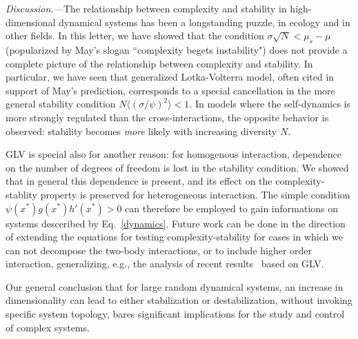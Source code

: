 \emph{Discussion.---}The relationship between complexity and stability in high-dimensional dynamical systems has been a longstanding puzzle, in ecology and in other fields. 
In this letter, we have showed that the condition $\sigma\sqrt{N}< \mu_s - \mu$ (popularized by May's slogan ``complexity begets instability") does not provide a complete picture of the relationship between complexity and stability. 
In particular, we have seen that generalized Lotka-Volterra model, often cited in support of May's prediction, corresponds to a special cancellation in the more general stability condition $N\langle (\sigma/\psi)^2\rangle < 1$.
In models where the self-dynamics is more strongly regulated than the cross-interactions, the opposite behavior is observed: stability becomes \emph{more} likely with increasing diversity $N$.

GLV is special also for another reason: for homogenous interaction, dependence on the number of degrees of freedom is lost in the stability condition.
We showed that in general this dependence is present, and its effect on the complexity-stablity property is preserved for heterogeneous interaction. 
The simple condition $\psi(x^*)g(x^*)h'(x^*)>0$ can therefore be employed to gain informations on systems desceribed by Eq.~\eqref{dynamics}.
Future work can be done in the direction of extending the equations for testing complexity-stability for cases in which we can not decompose the two-body interactions, or to include higher order interaction, generalizing, e.g., the analysis of recent results~\cite{Gibbs2022} based on GLV. 


Our general conclusion that for large random dynamical systems, an increase in dimensionality can lead to either stabilization or destabilization, without invoking specific system topology, bares significant implications for the study and control of complex systems.